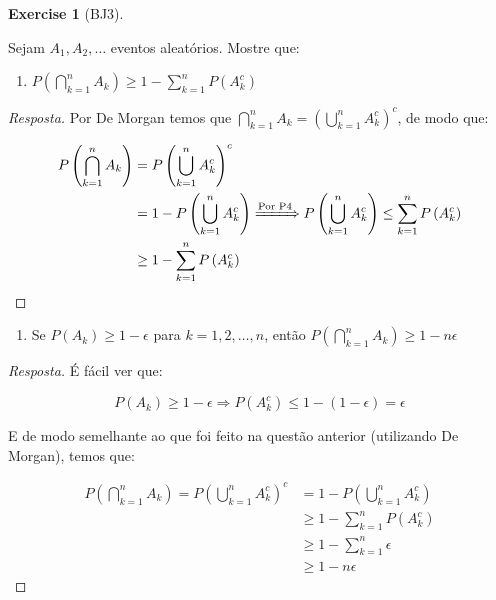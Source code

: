 \documentclass[
]{article}
\providecommand{\tightlist}{%
  \setlength{\itemsep}{0pt}\setlength{\parskip}{0pt}}
\theoremstyle{definition}
\theoremstyle{definition}
\theoremstyle{definition}
\newtheorem{exercise}{Exercise}[section]
\theoremstyle{definition}
\theoremstyle{remark}
\begin{document}
\begin{exercise}[BJ3]
\protect\hypertarget{exr:exbj3}{}\label{exr:exbj3}

Sejam \(A_{1}, A_{2},\dots\) eventos aleatórios. Mostre que:

\begin{enumerate}
\def\labelenumi{\alph{enumi})}
\tightlist
\item
  \(P\left(\bigcap_{k=1}^{n}A_{k}\right) \ge 1 - \sum_{k=1}^{n}P(A_{k}^{c})\)
\end{enumerate}

\begin{proof}[Resposta]
Por De Morgan temos que \(\bigcap_{k=1}^{n}A_{k} = \left(\bigcup_{k=1}^{n}A_{k}^{c}\right)^{c}\), de modo que:

\begin{align*}
P\left(\bigcap_{k=1}^{n}A_{k}\right) &= P\left(\bigcup_{k=1}^{n}A_{k}^{c}\right)^{c} \\
&= 1 - P\left(\bigcup_{k=1}^{n}A_{k}^{c}\right) \xRightarrow[]{\text{Por P4}} P\left(\bigcup_{k=1}^{n}A_{k}^{c}\right) \le \sum_{k=1}^{n}P\left(A_{k}^{c}\right) \\
&\ge 1 - \sum_{k=1}^{n}P\left(A_{k}^{c}\right)
\end{align*}
\end{proof}

\begin{enumerate}
\def\labelenumi{\alph{enumi})}
\setcounter{enumi}{1}
\tightlist
\item
  Se \(P(A_{k}) \ge 1 - \epsilon\) para \(k = 1,2,\dots,n\), então \(P(\bigcap_{k=1}^{n}A_{k}) \ge 1 - n\epsilon\)
\end{enumerate}

\begin{proof}[Resposta]
É fácil ver que:

\[
P(A_{k}) \ge 1 - \epsilon \Rightarrow P(A_{k}^{c}) \le 1 - (1-\epsilon) = \epsilon
\]

E de modo semelhante ao que foi feito na questão anterior (utilizando De Morgan), temos que:

\begin{align*}
P\left(\bigcap_{k=1}^{n}A_{k}\right) = P\left(\bigcup_{k=1}^{n}A_{k}^{c}\right)^{c} &= 1 - P\left(\bigcup_{k=1}^{n}A_{k}^{c}\right)\\
&\ge 1 - \sum_{k=1}^{n}P\left(A_{k}^{c}\right) \\
&\ge 1 - \sum_{k=1}^{n}\epsilon\\
&\ge 1 - n\epsilon
\end{align*}
\end{proof}


\end{exercise}
\end{document}
